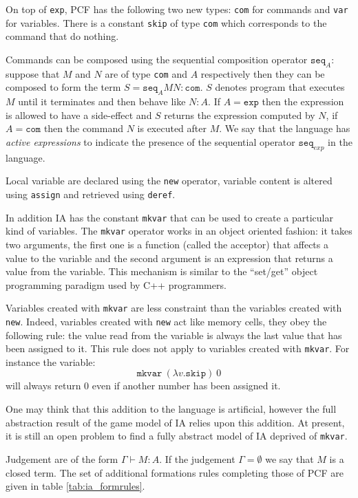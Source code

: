 On top of \texttt{exp}, PCF has the following two new types:
\texttt{com} for commands and \texttt{var} for variables. There is a
constant \texttt{skip} of type \texttt{com} which corresponds to the
command that do nothing.

Commands can be composed using the
sequential composition operator $\texttt{seq}_A$: suppose that $M$ and $N$ are of type
\texttt{com} and $A$ respectively then they can be composed to form the term
$S = \texttt{seq}_A M N : \texttt{com}$. $S$ denotes program that executes $M$ until it terminates and then
behave like $N:A$. If $A = \texttt{exp}$ then the expression is allowed to have a side-effect and $S$ returns the expression computed by $N$, if
$A = \texttt{com}$ then the command $N$ is executed after $M$.
We say that the language has \emph{active expressions} to indicate the presence of the
sequential operator $\texttt{seq}_{exp}$ in the language.


Local variable are
declared using the \texttt{new} operator, variable content is altered
using \texttt{assign} and retrieved using \texttt{deref}.

In addition IA has the constant \texttt{mkvar} that can be used to
create a particular kind of variables. The \texttt{mkvar} operator
works in an object oriented fashion: it takes two arguments, the
first one is a function (called the acceptor) that affects a value
to the variable and the second argument is an expression that
returns a value from the variable. This mechanism is similar to
the ``set/get'' object programming paradigm used by C++ programmers.

Variables created with \texttt{mkvar} are less constraint than the
variables created with \texttt{new}. Indeed, variables created with
\texttt{new} act like memory cells, they obey the following rule: the value read
from the variable is always the last value that has been assigned to
it. This rule does not apply to variables created with
\texttt{mkvar}. For instance the variable:
$$\texttt{mkvar}\ (\lambda v.\texttt{skip})\ 0$$
will always return $0$ even if another number has been assigned it.


One may think that this addition to the language is artificial,
however the full abstraction result of the game model of IA relies
upon this addition. At present, it is still an open problem to find
a fully abstract model of IA deprived of \texttt{mkvar}.

Judgement are of the form $\Gamma \vdash M : A$.
If the judgement $\Gamma = \emptyset$ we say that $M$ is a closed term.
The set of additional formations rules completing those of PCF are
given in table \ref{tab:ia_formrules}.

